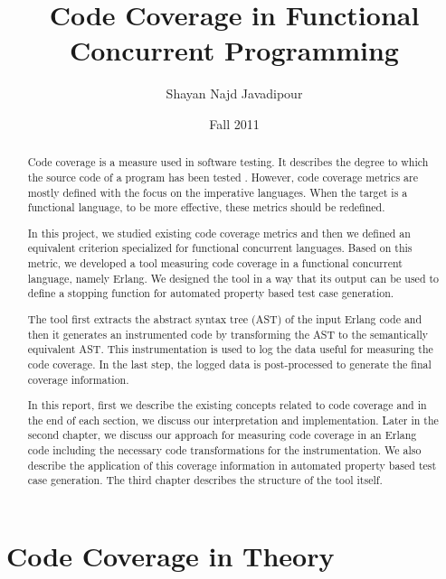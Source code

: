 \documentclass[12pt,a4paper]{report}
\title{Code Coverage in Functional Concurrent Programming}
\author{Shayan Najd Javadipour}
\date{Fall 2011}
\begin{document}
\maketitle
\begin{abstract}
Code coverage is a measure used in software testing. It describes the degree to which the source code of a program has been tested \cite{huizinga2007automated}. However, code coverage metrics are mostly defined with the focus on the imperative languages. When the target is a functional language, to be more effective, these metrics should be redefined.

In this project, we studied existing code coverage metrics and then we defined an equivalent criterion specialized for functional concurrent languages. Based on this metric, we developed a tool measuring code coverage in a functional concurrent language, namely Erlang. We designed the tool in a way that its output can be used to define a stopping function for automated property based test case generation.

The tool first extracts the abstract syntax tree (AST) of the input Erlang code and then it generates an instrumented code by transforming the AST to the semantically equivalent AST. This instrumentation is used to log the data useful for measuring the code coverage. In the last step, the logged data is post-processed to generate the final coverage information.  

In this report, first we describe the existing concepts related to code coverage and in the end of each section, we discuss our interpretation and implementation. Later in the second chapter, we discuss our approach for measuring code coverage in an Erlang code including the necessary code transformations for the instrumentation. We also describe the application of this coverage information in automated property based test case generation. The third chapter describes the structure of the tool itself. 
\end{abstract}
\tableofcontents
\listoffigures
\chapter{Code Coverage in Theory}
\newpage
\end{document}
